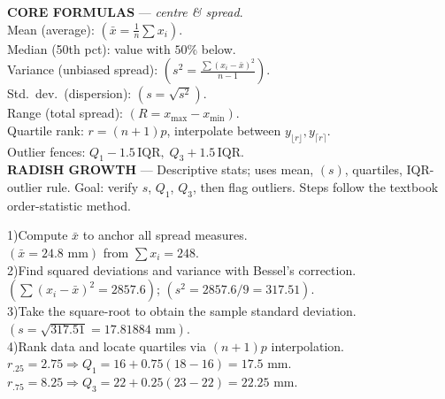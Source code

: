 \documentclass[landscape,0.4pt]{article}
\begin{document}
\begin{multicols*}{6}
\textbf{\tiny{CORE FORMULAS}} — \textit{centre \& spread}.\\
Mean (average): $(\bar{x}=\frac1n\sum x_i)$.\\
Median (50th pct): value with $50\%$ below.\\
Variance (unbiased spread): $(s^{2}=\frac{\sum(x_i-\bar{x})^{2}}{n-1})$.\\
Std.\ dev.\ (dispersion): $(s=\sqrt{s^{2}})$.\\
Range (total spread): $(R=x_{\max}-x_{\min})$.\\
Quartile rank: $r=(n+1)p$, interpolate between $y_{\lfloor r\rfloor},y_{\lceil r\rceil}$.\\
Outlier fences: $Q_{1}-1.5\,\text{IQR},\;Q_{3}+1.5\,\text{IQR}$.\\[-2pt]


\textbf{\tiny{RADISH GROWTH}} — Descriptive stats; uses mean, $(s)$, quartiles, IQR-outlier rule.  
Goal: verify $s$, $Q_{1}$, $Q_{3}$, then flag outliers.  Steps follow the textbook order-statistic method.

1)\;Compute $\bar{x}$ to anchor all spread measures.\\
\hspace*{1em}$(\bar{x}=24.8\text{ mm})$ from $\sum x_i=248$.\\

2)\;Find squared deviations and variance with Bessel’s correction.\\
\hspace*{1em}$(\sum(x_i-\bar{x})^{2}=2857.6)$; $(s^{2}=2857.6/9=317.51)$.\\

3)\;Take the square-root to obtain the sample standard deviation.\\
\hspace*{1em}$(s=\sqrt{317.51}=17.81884\text{ mm})$.\\

4)\;Rank data and locate quartiles via $(n+1)p$ interpolation.\\
\hspace*{1em}$r_{.25}=2.75\Rightarrow Q_{1}=16+0.75(18-16)=17.5\text{ mm}$.\\
\hspace*{1em}$r_{.75}=8.25\Rightarrow Q_{3}=22+0.25(23-22)=22.25\text{ mm}$.\\


\end{multicols*}
\end{document}
